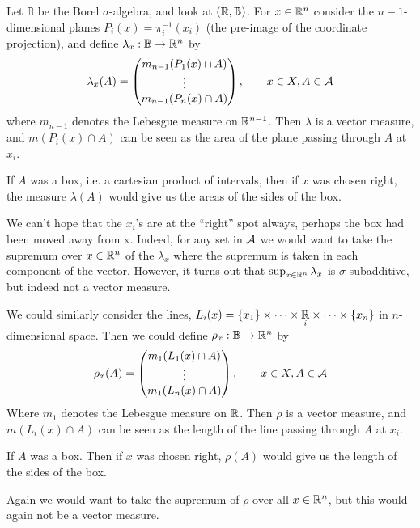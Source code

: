 \begin{example}\label{ex: selfmade examples}
Let $\mathbb{B}$ be the Borel $\sigma$-algebra, and look at $(\mathbb{R}, \mathbb{B})$. For $x\in \mathbb{R}^{n}$ consider the $n-1$-dimensional planes $P_{i}(x)=\pi_{i}^{-1}(x_{i})$ (the pre-image of the coordinate projection), and define $\lambda_{x}:\mathbb{B}\to \mathbb{R}^{n}$ by
\begin{align*}
	\lambda_{x}(A)=\begin{pmatrix}
		m_{n-1}(P_{1}(x)\cap A) \\
		\vdots \\
		m_{n-1}(P_{n}(x)\cap A)
	\end{pmatrix}, \qquad x\in X, A\in \mathcal{A}
\end{align*}
where $m_{n-1}$ denotes the Lebesgue measure on $\mathbb{R}^{n-1}$. Then $\lambda$ is a vector measure, and $m(P_{i}(x)\cap A)$ can be seen as the area of the plane passing through $A$ at $x_{i}$.

If $A$ was a box, i.e. a cartesian product of intervals, then if $x$ was chosen right, the measure $\lambda(A)$ would give us the areas of the sides of the box.

We can't hope that the $x_{i}$'s are at the ``right'' spot always, perhaps the box had been moved away from x. Indeed, for any set in $\mathcal{A}$ we would want to take the supremum over $x\in \mathbb{R}^{n}$ of the $\lambda_{x}$ where the supremum is taken in each component of the vector. However, it turns out that $\sup_{x\in \mathbb{R}^{n}}\lambda_{x}$ is $\sigma$-subadditive, but indeed not a vector measure.

We could similarly consider the lines, $L_{i}(x)=\{x_{1}\}\times \dots \times \underset{i}{\mathbb{R}}\times \dots \times \{x_{n}\}$ in $n$-dimensional space. Then we could define $\rho_{x}:\mathbb{B}\to \mathbb{R}^{n}$ by
\begin{align*}
	\rho_{x}(A)=\begin{pmatrix}
		m_{1}(L_{1}(x)\cap A) \\
		\vdots \\
		m_{1}(L_{n}(x)\cap A)
	\end{pmatrix}, \qquad x\in X, A\in \mathcal{A}
\end{align*}
Where $m_{1}$ denotes the Lebesgue measure on $\mathbb{R}$. Then $\rho$ is a vector measure, and $m(L_{i}(x)\cap A)$ can be seen as the length of the line passing through $A$ at $x_{i}$.

If $A$ was a box. Then if $x$ was chosen right, $\rho(A)$ would give us the length of the sides of the box.

Again we would want to take the supremum of $\rho$ over all $x\in \mathbb{R}^{n}$, but this would again not be a vector measure.
\end{example}


